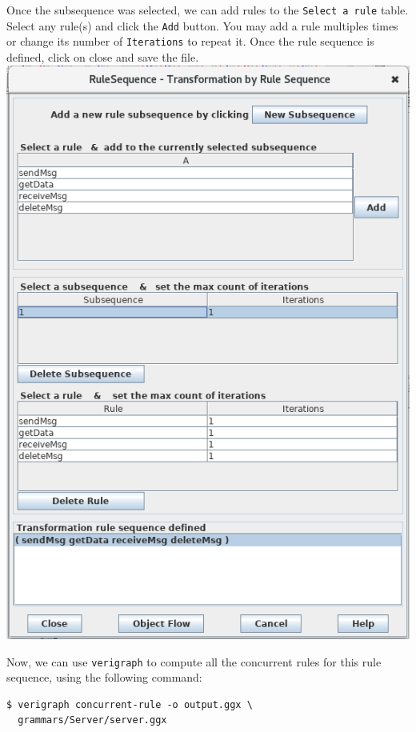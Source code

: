 \documentclass[12pt]{article}
\newenvironment{tutorialstep}
	{\hspace{-\parindent}\begin{minipage}{\textwidth}}
    {\vspace{.3cm}\end{minipage}}
\begin{document}
\begin{tutorialstep}

  Once the subsequence was selected, we can add rules to the \texttt{Select a rule} table. Select any rule(s) and click the \texttt{Add} button. You may add a rule multiples times or change its number of \texttt{Iterations} to repeat it. Once the rule sequence is defined, click on close and save the file.\\

  \noindent
  \centering
  \includegraphics[scale = 0.6]{rule-sequence_03.png}\\
\end{tutorialstep}

Now, we can use \texttt{verigraph} to compute all the concurrent rules for this rule sequence, using the following command:

\begin{verbatim}
$ verigraph concurrent-rule -o output.ggx \
  grammars/Server/server.ggx
\end{verbatim}
\end{document}
